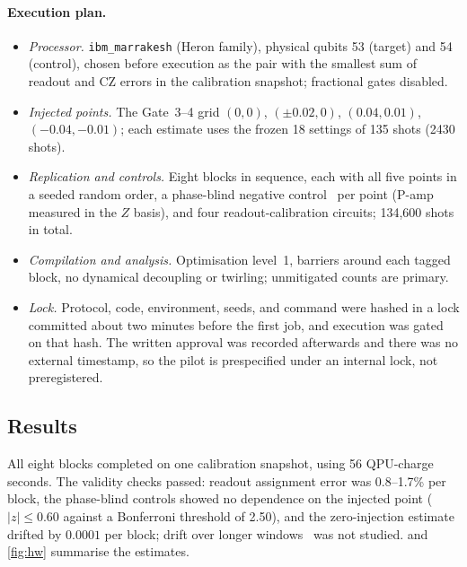 \documentclass[10pt,twocolumn]{article}
\theoremstyle{definition}
\theoremstyle{remark}
\begin{document}
\paragraph{Execution plan.}
\begin{itemize}
\item \emph{Processor.} \texttt{ibm\_marrakesh} (Heron family), physical qubits 53 (target) and 54 (control), chosen before execution as the pair with the smallest sum of readout and CZ errors in the calibration snapshot; fractional gates disabled.
\item \emph{Injected points.} The Gate~3--4 grid $(0,0)$, $(\pm0.02,0)$, $(0.04,0.01)$, $(-0.04,-0.01)$; each estimate uses the frozen 18 settings of 135 shots (2430 shots).
\item \emph{Replication and controls.} Eight blocks in sequence, each with all five points in a seeded random order, a phase-blind negative control~\cite{lipsitch2010} per point (P-amp measured in the $Z$ basis), and four readout-calibration circuits; 134{,}600 shots in total.
\item \emph{Compilation and analysis.} Optimisation level~1, barriers around each tagged block, no dynamical decoupling or twirling; unmitigated counts are primary.
\item \emph{Lock.} Protocol, code, environment, seeds, and command were hashed in a lock committed about two minutes before the first job, and execution was gated on that hash. The written approval was recorded afterwards and there was no external timestamp, so the pilot is prespecified under an internal lock, not preregistered.
\end{itemize}

\subsection{Results}
All eight blocks completed on one calibration snapshot, using 56 QPU-charge seconds. The validity checks passed: readout assignment error was 0.8--1.7\% per block, the phase-blind controls showed no dependence on the injected point ($|z|\le0.60$ against a Bonferroni threshold of 2.50), and the zero-injection estimate drifted by $0.0001$ per block; drift over longer windows~\cite{proctor2020drift} was not studied.  and \cref{fig:hw} summarise the estimates.
\end{document}
